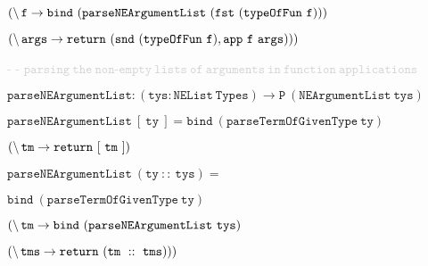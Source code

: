 \hspace{1.65cm}
{\small{$\mathtt{(\char`\\ \, f \to bind ~(parseNEArgumentList ~(fst ~(typeOfFun ~f)))}$}}

\vspace{-0.1cm}

\hspace{3.7cm}
{\small{$\mathtt{(\char`\\ \, args \to return ~(snd ~(typeOfFun ~f) , app ~f ~args)))}$}}

\vspace{0.25cm}

\hspace{0.5cm}
{\small{\textcolor{lightgray}{- - $\mathtt{parsing ~the ~non\text{-}empty ~lists ~of ~arguments ~in ~function ~applications}$}}}

\hspace{0.5cm}
{\small{$\mathtt{parseNEArgumentList : (tys : NEList ~Types) \to P ~(NEArgumentList ~tys)}$}}

\hspace{0.5cm}
{\small{$\mathtt{parseNEArgumentList ~[ ~ty~ ]      = bind ~(parseTermOfGivenType ~ty)}$}}

\vspace{-0.1cm}

\hspace{6.65cm}
{\small{$\mathtt{(\char`\\ \, tm \to return ~[ ~tm~ ])}$}}

\hspace{0.5cm}
{\small{$\mathtt{parseNEArgumentList ~(ty ~::~ tys) =}$}}

\vspace{-0.1cm}

\hspace{0.75cm}
{\small{$\mathtt{bind ~(parseTermOfGivenType ~ty)}$}}

\vspace{-0.1cm}

\hspace{1.65cm}
{\small{$\mathtt{(\char`\\ \, tm \to bind ~(parseNEArgumentList ~tys)}$}}

\vspace{-0.1cm}

\hspace{3.9cm}
{\small{$\mathtt{(\char`\\ \, tms \to return ~(tm ~::~ tms)))}$}}

\vspace{0.25cm}

